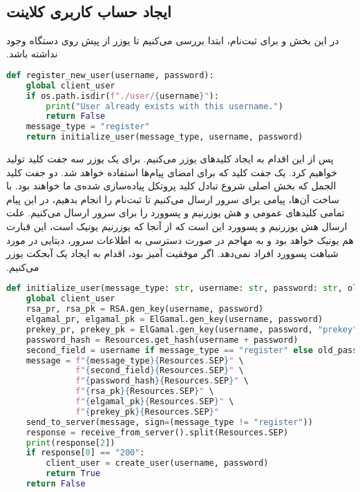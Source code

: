 ‫\subsection{ایجاد حساب کاربری کلاینت}
‫در این بخش و برای ثبت‌نام، ابتدا بررسی می‌کنیم تا یوزر از پیش روی دستگاه وجود نداشته باشد.
‫

\begin{latin}
\begin{lstlisting}[firstnumber=166, language=Python]
def register_new_user(username, password):
    global client_user
    if os.path.isdir(f"./user/{username}"):
        print("User already exists with this username.")
        return False
    message_type = "register"
    return initialize_user(message_type, username, password)
\end{lstlisting}
\end{latin}

‫پس از این اقدام به ایجاد کلید‌های یوزر می‌کنیم. برای یک یوزر سه جفت کلید تولید خواهیم کرد. یک جفت کلید  که برای امضای پیام‌ها استفاده خواهد شد. دو جفت کلید الجمل که بخش اصلی شروع تبادل کلید پروتکل‌ پیاده‌سازی شده‌ی ما خواهند بود. با ساخت آن‌ها، پیامی برای سرور ارسال می‌کنیم تا ثبت‌نام را انجام بدهیم، در این پیام تمامی کلیدهای عمومی و هش یوزرنیم و پسوورد را برای سرور ارسال می‌کنیم. علت ارسال هش یوزرنیم و پسوورد این است که از آنجا که یوزرنیم یونیک است، این قبارت هم یونیک خواهد بود و به مهاجم در صورت دسترسی به اطلاعات سرور، دیتایی در مورد شباهت پسوورد افراد نمی‌دهد. اگر موفقیت آمیز بود، اقدام به ایجاد یک آبجکت یوزر می‌کنیم.
‫
‫
\begin{latin}
\begin{lstlisting}[firstnumber=175, language=Python]
def initialize_user(message_type: str, username: str, password: str, old_password_hash="") -> bool:
    global client_user
    rsa_pr, rsa_pk = RSA.gen_key(username, password)
    elgamal_pr, elgamal_pk = ElGamal.gen_key(username, password)
    prekey_pr, prekey_pk = ElGamal.gen_key(username, password, "prekey")
    password_hash = Resources.get_hash(username + password)
    second_field = username if message_type == "register" else old_password_hash
    message = f"{message_type}{Resources.SEP}" \
              f"{second_field}{Resources.SEP}" \
              f"{password_hash}{Resources.SEP}" \
              f"{rsa_pk}{Resources.SEP}" \
              f"{elgamal_pk}{Resources.SEP}" \
              f"{prekey_pk}{Resources.SEP}"
    send_to_server(message, sign=(message_type != "register"))
    response = receive_from_server().split(Resources.SEP)
    print(response[2])
    if response[0] == "200":
        client_user = create_user(username, password)
        return True
    return False
\end{lstlisting}
\end{latin}

